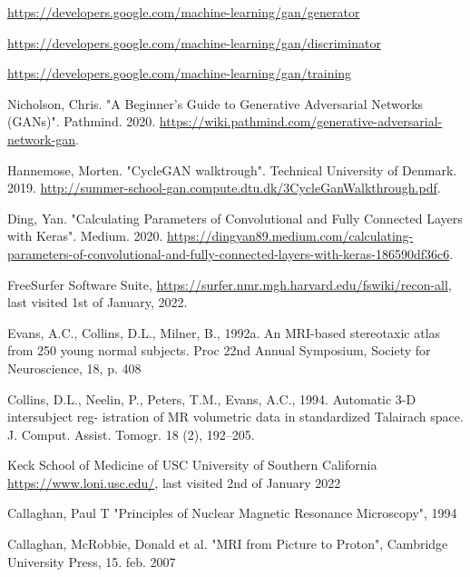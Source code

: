 \documentclass[12pt, fleqn, titlepage]{article}
\begin{document}
\begin{thebibliography}{9}
		 \url{https://developers.google.com/machine-learning/gan/generator} %
		
		 \url{https://developers.google.com/machine-learning/gan/discriminator} %
		
		 \url{https://developers.google.com/machine-learning/gan/training} %
		
		 Nicholson, Chris. "A Beginner's Guide to Generative Adversarial Networks (GANs)". Pathmind. 2020. \url{https://wiki.pathmind.com/generative-adversarial-network-gan}.
		
		 Hannemose, Morten. "CycleGAN walktrough". Technical University of Denmark. 2019. \url{http://summer-school-gan.compute.dtu.dk/3CycleGanWalkthrough.pdf}.
		
		 Ding, Yan. "Calculating Parameters of Convolutional and Fully Connected Layers with Keras". Medium. 2020. \url{https://dingyan89.medium.com/calculating-parameters-of-convolutional-and-fully-connected-layers-with-keras-186590df36c6}.

		 FreeSurfer Software Suite, \url{https://surfer.nmr.mgh.harvard.edu/fswiki/recon-all}, last visited 1st of January, 2022.
		
		 Evans, A.C., Collins, D.L., Milner, B., 1992a. An MRI-based stereotaxic atlas from 250 young normal subjects. Proc 22nd Annual Symposium, Society for Neuroscience, 18, p. 408
		
		 Collins, D.L., Neelin, P., Peters, T.M., Evans, A.C., 1994. Automatic 3-D intersubject reg- istration of MR volumetric data in standardized Talairach space. J. Comput. Assist. Tomogr. 18 (2), 192–205.
		
		 Keck School of Medicine of USC University of Southern California \url{https://www.loni.usc.edu/}, last visited 2nd of January 2022
		
		 Callaghan, Paul T "Principles of Nuclear
		Magnetic Resonance Microscopy", 1994
		
		 Callaghan, McRobbie, Donald et al. "MRI from Picture to Proton", Cambridge University Press, 15. feb. 2007
		

\end{thebibliography}
\end{document}
